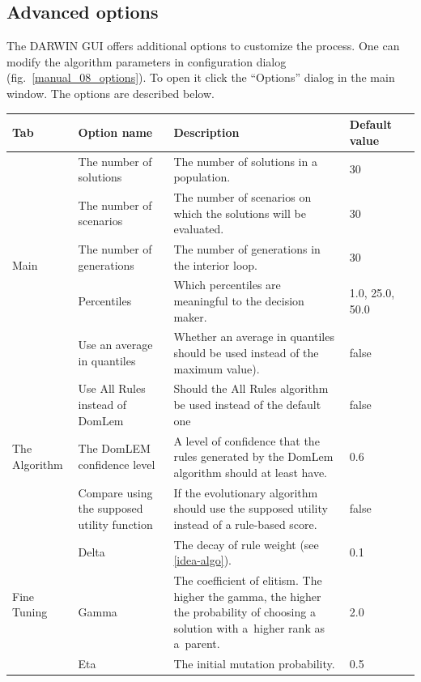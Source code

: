 \clearpage{}
\subsection*{Advanced options}

The DARWIN GUI offers additional options to customize the process. One can
modify the algorithm parameters in configuration dialog
(fig.~\ref{manual_08_options}). To open it click the ``Options'' dialog in the
main window. The options are described below.

\begin{table}[htb]
  \centering
  \begin{tabular}{l p{3.5cm} p{6.5cm} l l}
    \hline
    Tab & Option name & Description & Default value \\
    \hline
    \hline
    \multirow{5}{*}{Main}
    & The number of solutions & The number of solutions in a population. & 30 \\
    & The number of scenarios & The number of scenarios on which the solutions will be evaluated.  & 30 \\
    & The number of generations & The number of generations in the interior loop. & 30 \\
    & Percentiles & Which percentiles are meaningful to the decision maker. & 1.0, 25.0, 50.0  \\
    & Use an average in quantiles & Whether an average in quantiles should be used instead of
    the maximum value). & false  \\
    \hline
    \multirow{3}{*}{The Algorithm}
    & Use All Rules instead of DomLem & Should the All Rules algorithm be used
    instead of the default one & false \\
    & The DomLEM confidence level & A level of confidence that the rules generated by the
    DomLem algorithm should at least have. & 0.6 \\
    & Compare using the supposed utility function & If the evolutionary algorithm should use the
    supposed utility instead of a rule-based score. & false \\
    \hline
    \multirow{4}{*}{Fine Tuning} 
    & Delta & The decay of rule weight (see \ref{idea-algo}). & 0.1  \\
    & Gamma & The coefficient of elitism. The higher the gamma, the
    higher the probability of choosing a solution with a~higher rank as
    a~parent. & 2.0  \\ 
    & Eta & The initial mutation probability.  & 0.5    \\

\end{tabular}
\end{table}
